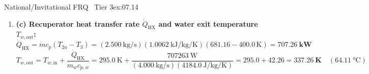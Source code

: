 \begin{workedexample}{National/Invitational FRQ \textbar\ Tier 3}{ex:07.14}
\begin{enumerate}
  \[
    T_1 - T_{2a} = \eta_t(T_1 - T_{2s}) = 0.8500(1100.0 - 607.25) = \SI{418.84}{\kelvin} \implies T_{2a} = 1100.0 - 418.84 = \mathbf{\SI{681.16}{\kelvin}}
  \]
  Specific kinetic energy change across the turbine is $\Delta\mathrm{ke} = \frac{1}{2}(v_{\mathrm{flow},2}^2 - v_{\mathrm{flow},1}^2) = \frac{1}{2}(160.0^2 - 40.00^2) = +\SI{12000}{\joule\per\kilogram} = \mathbf{+\SI{12.00}{\kilo\joule\per\kilogram}}$. Applying the SFEE  with $\dot{Q}_{\mathrm{cv}} = 0$:
  \[
    w_{t,\mathrm{by}} = c_p(T_1 - T_{2a}) - \frac{v_{\mathrm{flow},2}^2 - v_{\mathrm{flow},1}^2}{2} = (\SI{1.0062}{\kilo\joule\per\kilogram\per\kelvin})(418.84\,\si{\kelvin}) - \SI{12.00}{\kilo\joule\per\kilogram} = 421.43 - 12.00 = \mathbf{\SI{409.43}{\kilo\joule\per\kilogram}}
  \]
  \[
    \dot{W}_{t,\mathrm{by}} = \dot{m}\,w_{t,\mathrm{by}} = (\SI{2.500}{\kilogram\per\second})(\SI{409.43}{\kilo\joule\per\kilogram}) = \mathbf{\SI{1023.6}{\kilo\watt}} = \mathbf{\SI{1.0236}{\mega\watt}}
  \]
  \item \textbf{(c) Recuperator heat transfer rate $\dot{Q}_{\mathrm{HX}}$ and water exit temperature $T_{w,\mathrm{out}}$:}
  \[
    \dot{Q}_{\mathrm{HX}} = \dot{m} c_p (T_{2a} - T_3) = (\SI{2.500}{\kilogram\per\second})(\SI{1.0062}{\kilo\joule\per\kilogram\per\kelvin})(681.16 - 400.0\,\si{\kelvin}) = \mathbf{\SI{707.26}{\kilo\watt}}
  \]
  \[
    T_{w,\mathrm{out}} = T_{w,\mathrm{in}} + \frac{\dot{Q}_{\mathrm{HX}}}{\dot{m}_w c_{p,w}} = \SI{295.0}{\kelvin} + \frac{\SI{707263}{\watt}}{(\SI{4.000}{\kilogram\per\second})(\SI{4184.0}{\joule\per\kilogram\per\kelvin})} = 295.0 + 42.26 = \mathbf{\SI{337.26}{\kelvin}} \quad (\SI{64.11}{\celsius})
  \]
\end{enumerate}
\end{workedexample}

